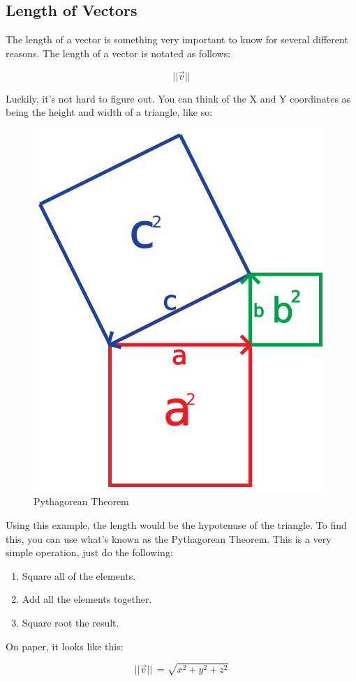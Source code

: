 \subsection{\textsf{Length of Vectors}}
The length of a vector is something very important to know for several different reasons. The length of a vector is notated as follows:

\begin{equation*}
||\vec{v} ||
\end{equation*}

Luckily, it's not hard to figure out. You can think of the X and Y coordinates as being the height and width of a triangle, like so:

\begin{figure}[hb!]
      \centering
      \includegraphics[width=0.4\linewidth]{images/chap2/PythagoreanTheorem.png}
      \caption{Pythagorean Theorem}
      \label{fig:pythagorean_theorem}
\end{figure}

\newpage

Using this example, the length would be the hypotenuse of the triangle. To find this, you can use what's known as the Pythagorean Theorem. This is a very simple operation, just do the following:

\begin{enumerate}
    \item Square all of the elements.
    \item Add all the elements together.
    \item Square root the result.
\end{enumerate}


On paper, it looks like this:

\begin{equation*}
||\vec{v} ||\ =\sqrt{x^{2} +y^{2} +z^{2}}
\end{equation*}

